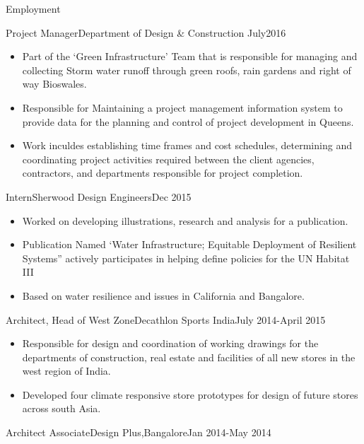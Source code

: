 \documentclass[]{nakulcv}
\begin{document}
	\makeheader
	
	\begin{cvsection}{Employment}
		\begin{cvsubsection}{Project Manager}{Department of Design \& Construction }{July2016}
				\begin{itemize}
					\item Part of the ‘Green Infrastructure’ Team that is responsible for managing and collecting Storm water runoff through green roofs, rain gardens and right of way Bioswales. 	
					\item Responsible for Maintaining a project management information system to provide data for the planning and control of project development in Queens. 
					\item Work inculdes establishing time frames and cost schedules, determining and coordinating project activities required between the client agencies, contractors, and departments responsible for project completion. 
				\end{itemize}
				\begin{cvsubsection}{Intern}{Sherwood Design Engineers}{Dec 2015}
				\begin{itemize}
					\item Worked on developing illustrations, research and analysis for a publication.  
					\item Publication Named ‘Water Infrastructure; Equitable Deployment of Resilient Systems” actively participates in helping define policies for the UN Habitat III
					\item Based on water resilience and issues in California and Bangalore. 
				\end{itemize}
			\end{cvsubsection}
			\begin{cvsubsection}{Architect, Head of West Zone}{Decathlon Sports India}{July 2014-April 2015}
				\begin{itemize}
					\item Responsible for design and coordination of working drawings for the departments of construction, real estate and facilities of all new stores in the west region of India. 
					\item Developed four climate responsive store prototypes for design of future stores across south Asia. 
				\end{itemize}
			\end{cvsubsection}
			\begin{cvsubsection}{Architect Associate}{Design Plus,Bangalore}{Jan 2014-May 2014}

\end{cvsubsection}
\end{cvsubsection}
\end{cvsection}
\end{document}
